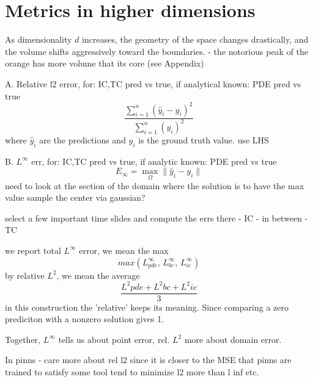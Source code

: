 

\section{Metrics in higher dimensions}

As dimensionality $d$ increases, the geometry of the space changes drastically,
and the volume shifts aggressively toward the boundaries.
- the notorious peak of the orange has more volume that its core (see Appendix)


A. Relative l2 error, for:
IC,TC pred vs true, if analytical known: PDE pred vs true
$$
\frac{
\sum_{i=1}^n(\hat y_i - y_i)^2
}{
\sum_{i=1}^n(y_i)^2
}
$$
where $\hat y_i$ are the predictions and $y_i$ is the ground truth value.
use LHS

B. $L^\infty$ err, for:
IC,TC pred vs true, if analytic known: PDE pred vs true
$$
E_\infty = \max_\Omega\|\hat{y}_i - y_i\|
$$
need to look at the section of the domain where the solution is to have the max value
sample the center via gaussian?

select a few important time slides and compute the errs there
- IC
- in between
- TC

we report total $L^\infty$ error, we mean the max
$$
max(
L^\infty_{pde},\,
L^\infty_{bc},\,
L^\infty_{ic}
)
$$
by relative $L^2$, we mean the average
$$
\frac{
L^2{pde}+
L^2{bc}+
L^2{ic}
}{3}
$$
in this construction the 'relative' keeps its meaning.
Since comparing a zero prediciton with a nonzero solution gives 1.

Together, $L^\infty$ tells us about point error, rel. $L^2$ more about domain error.





In pinns - care more about rel l2 since it is closer to the MSE that pinns are trained to satisfy
some tool tend to minimize l2 more than l inf etc.